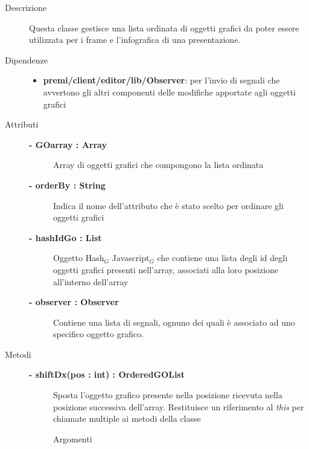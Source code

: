 \begin{description}
\item[Descrizione] \hfill
	Questa classe gestisce una lista ordinata di oggetti grafici da poter essere utilizzata per i frame e l'infografica di una presentazione.
	
	
\item[Dipendenze] \hfill
	\begin{itemize}
		\item \textbf{premi/client/editor/lib/Observer}: per l'invio di segnali che avvertono gli altri componenti delle modifiche apportate agli oggetti grafici
	\end{itemize}
	
	
\item[Attributi] \hfill
	\begin{description}
		\item[\textbf{- GOarray : Array			}] \hfill
			Array di oggetti grafici che compongono la lista ordinata
		\item[\textbf{- orderBy : String			}] \hfill
			Indica il nome dell'attributo che è stato scelto per ordinare gli oggetti grafici
		\item[\textbf{- hashIdGo : List			}] \hfill
			Oggetto Hash$_G$ Javascript$_G$ che contiene una lista degli id degli oggetti grafici presenti nell'array, associati alla loro posizione all'interno dell'array
		\item[\textbf{- observer : Observer			}] \hfill
			Contiene una lista di segnali, ognuno dei quali è associato ad uno specifico oggetto grafico.
	\end{description}
	
	
\item[Metodi] \hfill

	\begin{description}
		\item[\textbf{\color{blue}- shiftDx(pos : int) : OrderedGOList			}] \hfill
			Sposta l'oggetto grafico presente nella posizione ricevuta nella posizione successiva dell'array. Restituisce un riferimento al \textit{this} per chiamate multiple ai metodi della classe
			
		\begin{description}
			\item[Argomenti] \hfill
				\begin{itemize}
				

\end{itemize}
\end{description}
\end{description}
\end{description}
